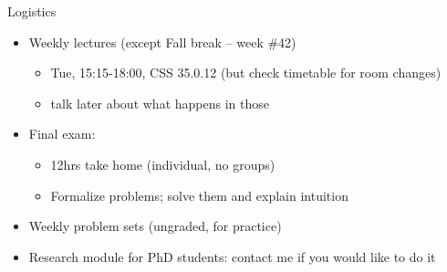 \documentclass[english,10pt
,aspectratio=169
]{beamer}
\begin{document}
\begin{frame}{Logistics}
	\begin{itemize}
		\item Weekly lectures (except Fall break -- week \#42)
		\begin{itemize}
			\item Tue, 15:15-18:00, CSS 35.0.12 (but check timetable for room changes)
			\item talk later about what happens in those
		\end{itemize}
		
		
		\pause
		\item Final exam:
		\begin{itemize}
			\item 12hrs take home (individual, no groups)
			\item Formalize problems; solve them and explain intuition
		\end{itemize}
		
		\pause
		\item Weekly problem sets (ungraded, for practice)
		
		\pause
		\item Research module for PhD students: contact me if you would like to do it
	\end{itemize}
\end{frame}


\end{document}
